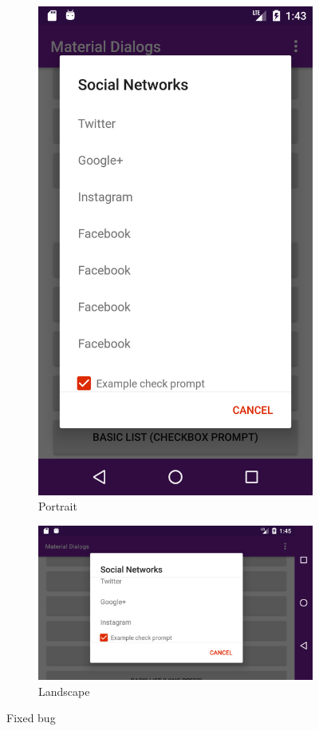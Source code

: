 \documentclass[12pt]{report}
\begin{document}
\begin{figure}[H]
\centering
\begin{subfigure}{.6\textwidth}
  \centering
  \includegraphics[width=0.4\linewidth,height=0.3\textheight]{screenshots/fixed1}
  \caption{Portrait}
  \label{fig:sub1}
\end{subfigure}%
\begin{subfigure}{.6\textwidth}
  \centering
  \includegraphics[width=.6\linewidth]{screenshots/fixed2}
  \caption{Landscape}
  \label{fig:sub2}
\end{subfigure}
\caption{Fixed bug}
\label{fig:test}
\end{figure}
\end{document}
